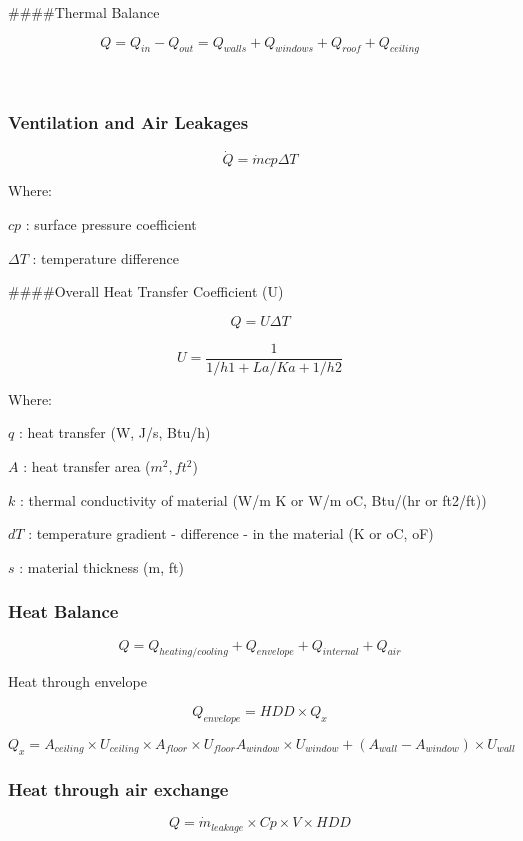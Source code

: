 \documentclass[]{book}
\theoremstyle{definition}
\theoremstyle{definition}
\theoremstyle{definition}
\theoremstyle{remark}
\begin{document}
\#\#\#\#Thermal Balance

\[Q= Q_{in} - Q_{out} = Q_{walls} + Q_{windows}+ Q_{roof}+ Q_{ceiling}\]

~

\subsubsection{Ventilation and Air
Leakages}\label{ventilation-and-air-leakages}

\[\dot{Q} = \dot{m}cp\Delta T\]

Where:

\(cp\) : surface pressure coefficient

\(\Delta T\) : temperature difference

\#\#\#\#Overall Heat Transfer Coefficient (U)

\[Q = U\Delta T\]

\[U = \frac{1}{1/h1 + La/Ka + 1/h2}\]

Where:

\(q\) : heat transfer (W, J/s, Btu/h)

\(A\) : heat transfer area (\(m^2, ft^2\))

\(k\) : thermal conductivity of material (W/m K or W/m oC, Btu/(hr or
ft2/ft))

\(dT\) : temperature gradient - difference - in the material (K or oC,
oF)

\(s\) : material thickness (m, ft)

\subsubsection{Heat Balance}\label{heat-balance}

\[Q  = Q_{heating/cooling} + Q_{envelope} + Q_{internal}+ Q_{air}\]

Heat through envelope

\[Q_{envelope}  = HDD\times  Q_{x}\]

\[Q_{x} = A_{ceiling} \times U_{ceiling} \times  A_{floor} \times U_{floor} A_{window} \times  U_{window} + ( A_{wall} - A_{window })  \times U_{wall}\]

\subsubsection{Heat through air
exchange}\label{heat-through-air-exchange}

\[Q = \dot{m} _{leakage} \times  Cp \times  V \times HDD\]
\end{document}
